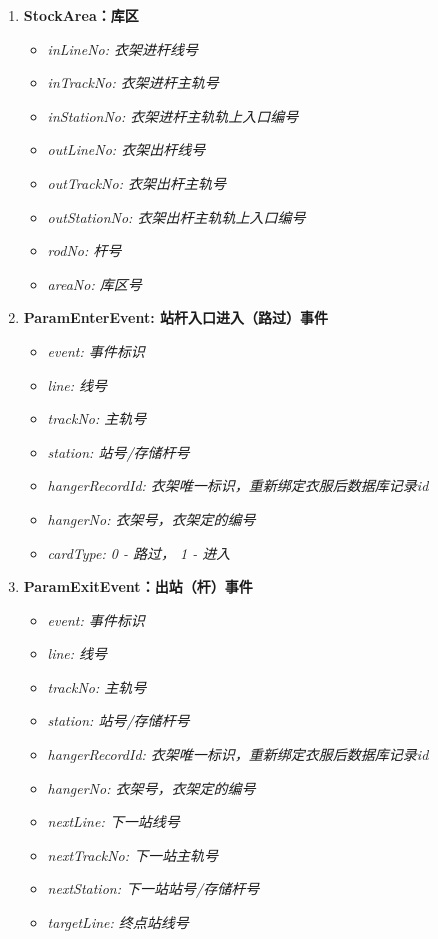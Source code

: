 \begin{enumerate}[label=\arabic*)]
\begin{itemize}
		\end{itemize}
		\item \bf{StockArea}：库区\label{sec:param-stockArea}
		\begin{itemize}
			\item \it{inLineNo}: 衣架进杆线号
			\item \it{inTrackNo}: 衣架进杆主轨号
			\item \it{inStationNo}: 衣架进杆主轨轨上入口编号
			\item \it{outLineNo}: 衣架出杆线号
			\item \it{outTrackNo}: 衣架出杆主轨号
			\item \it{outStationNo}: 衣架出杆主轨轨上入口编号
			\item \it{rodNo}: 杆号
			\item \it{areaNo}: 库区号
		\end{itemize}
		\item \bf{ParamEnterEvent}: 站杆入口进入（路过）事件
		\begin{itemize}
			\item \it{event}: 事件标识
			\item \it{line}: 线号
			\item \it{trackNo}: 主轨号
			\item \it{station}: 站号/存储杆号
			\item \it{hangerRecordId}: 衣架唯一标识，重新绑定衣服后数据库记录id
			\item \it{hangerNo}: 衣架号，衣架定的编号
			\item \it{cardType}: 0 - 路过， 1 - 进入
		\end{itemize}
		\item \bf{ParamExitEvent}：出站（杆）事件
		\begin{itemize}
			\item \it{event}: 事件标识
			\item \it{line}: 线号
			\item \it{trackNo}: 主轨号
			\item \it{station}: 站号/存储杆号
			\item \it{hangerRecordId}: 衣架唯一标识，重新绑定衣服后数据库记录id
			\item \it{hangerNo}: 衣架号，衣架定的编号
			\item \it{nextLine}: 下一站线号
			\item \it{nextTrackNo}: 下一站主轨号
			\item \it{nextStation}: 下一站站号/存储杆号
			\item \it{targetLine}: 终点站线号

\end{itemize}
\end{enumerate}
